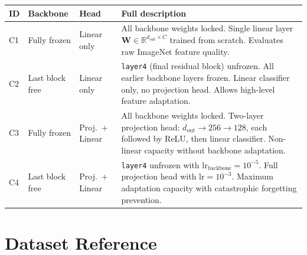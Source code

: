\documentclass[12pt, a4paper]{article}
\begin{document}
\begin{table}[h]
\centering
\begin{tabular}{L{1.5cm} L{2.5cm} L{3cm} L{7cm}}
\toprule
\textbf{ID} & \textbf{Backbone} & \textbf{Head} & \textbf{Full description} \\
\midrule
C1 & Fully frozen & Linear only &
  All backbone weights locked. Single linear layer $\mathbf{W} \in
  \mathbb{R}^{d_\text{out} \times C}$ trained from scratch.
  Evaluates raw ImageNet feature quality. \\[6pt]

C2 & Last block free & Linear only &
  \texttt{layer4} (final residual block) unfrozen.
  All earlier backbone layers frozen.
  Linear classifier only, no projection head.
  Allows high-level feature adaptation. \\[6pt]

C3 & Fully frozen & Proj.\ + Linear &
  All backbone weights locked.
  Two-layer projection head:
  $d_\text{out} \to 256 \to 128$, each followed by ReLU,
  then linear classifier.
  Non-linear capacity without backbone adaptation. \\[6pt]

C4 & Last block free & Proj.\ + Linear &
  \texttt{layer4} unfrozen with $\text{lr}_\text{backbone} = 10^{-5}$.
  Full projection head with $\text{lr} = 10^{-3}$.
  Maximum adaptation capacity with catastrophic forgetting prevention. \\[6pt]

\bottomrule
\end{tabular}
\end{table}

\section{Dataset Reference}
\end{document}
